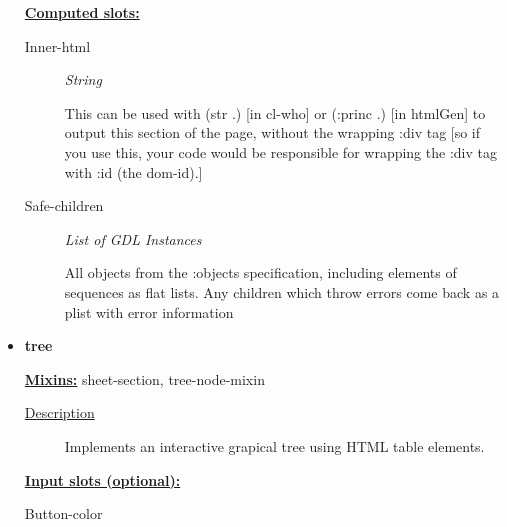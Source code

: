 \documentclass [11pt]{book}
\begin{document}
\begin{itemize}
\textbf{
\underline{Computed slots:}}

\begin{description}

\item [Inner-html]
\emph{String}

 This can be used with (str .) [in cl-who] or (:princ .) [in htmlGen]
to output this section of the page, without the wrapping :div tag [so if you use this,
your code would be responsible for wrapping the :div tag with :id (the dom-id).]




\item [Safe-children]
\emph{List of GDL Instances}

 All objects from the :objects specification, including elements of sequences
as flat lists. Any children which throw errors come back as a plist with error information




\end{description}







\item {}
\label{prim:tree}
\textbf{tree}


\textbf{
\underline{Mixins:}} sheet-section, tree-node-mixin





\begin{description}

\item [
\underline{Description}]


Implements an interactive grapical tree using HTML table elements.



\end{description}








\textbf{
\underline{Input slots (optional):}}

\begin{description}

\item [Button-color]






\end{description}
\end{itemize}
\end{document}

